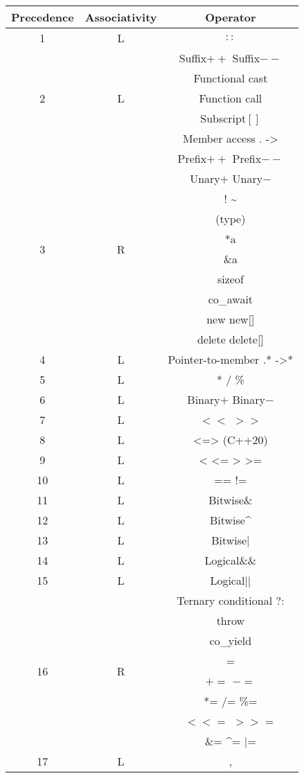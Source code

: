 \begin{tabular}{|c|c|c|}
    \hline
    Precedence & Associativity & Operator\\
    \hline
    1 & L & $ :: $ \\
    \hline
    \multirow{5}{*}{2} & \multirow{5}{*}{L} & Suffix$ ++ $ Suffix$ -- $ \\
    && Functional cast \\
    && Function call \\
    && Subscript$ [] $ \\
    && Member access . -> \\
    \hline
    \multirow{10}{*}{3} & \multirow{10}{*}{R} & Prefix$ ++ $ Prefix$ -- $ \\
    && Unary$ + $ Unary$ - $ \\
    && ! \~{} \\
    && (type) \\
    && *a \\
    && \&a \\
    && sizeof \\
    && co\_await \\
    && new new[] \\
    && delete delete[] \\
    \hline
    4 & L & Pointer-to-member .* ->* \\
    \hline
    5 & L & * / \% \\
    \hline
    6 & L & Binary$ + $ Binary$ - $ \\
    \hline
    7 & L & $<<$ $>>$ \\
    \hline
    8 & L & <=> (C++20) \\
    \hline
    9 & L & < <= > >= \\
    \hline
    10 & L & == != \\
    \hline
    11 & L & Bitwise\& \\
    \hline
    12 & L & Bitwise\^{} \\
    \hline
    13 & L & Bitwise| \\
    \hline
    14 & L & Logical\&\& \\
    \hline
    15 & L & Logical|| \\
    \hline
    \multirow{8}{*}{16} & \multirow{8}{*}{R} & Ternary conditional ?: \\
    && throw \\
    && co\_yield \\
    && = \\
    && $ += $ $ -= $ \\
    && *= /= \%= \\
    && $<<=$ $>>=$ \\
    && \&= \^{}= |= \\
    \hline
    17 & L & , \\
    \hline
\end{tabular}
